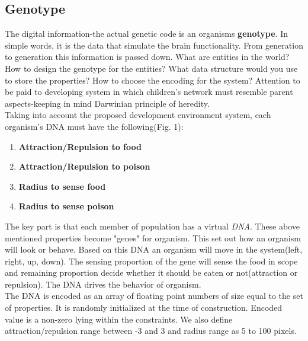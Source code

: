 \documentclass[conference]{IEEEtran}
\begin{document}
\subsection{Genotype}
The digital information-the actual genetic code is an organisms \textbf{genotype}. In simple words, it is the data that simulate the brain functionality. From generation to generation this information is passed down. What are entities in the world? How to design the genotype for the entities? What data structure would you use to store the properties? How to choose the encoding for the system? Attention to be paid to developing system in which children's network must resemble parent aspects-keeping in mind Darwinian principle of heredity.\\
Taking into account the proposed development environment system, each organism's DNA must have the following(Fig. 1):
\begin{enumerate}
\item \textbf{Attraction/Repulsion to food}
\item \textbf{Attraction/Repulsion to poison}
\item \textbf{Radius to sense food}
\item \textbf{Radius to sense poison}
\end{enumerate}
The key part is that each member of population has a virtual \textit{DNA}. These above mentioned properties become "genes" for organism. This set out how an organism will look or behave. Based on this DNA an organism will move in the system(left, right, up, down). The sensing proportion of the gene will sense the food in scope and remaining proportion decide whether it should be eaten or not(attraction or repulsion). The DNA drives the behavior of organism.\\
The DNA is encoded as an array of floating point numbers of size equal to the set of properties. It is randomly initialized at the time of construction. Encoded value is a non-zero lying within the constraints. We also define attraction/repulsion range between -3 and 3 and radius range as 5 to 100 pixels.
\end{document}

